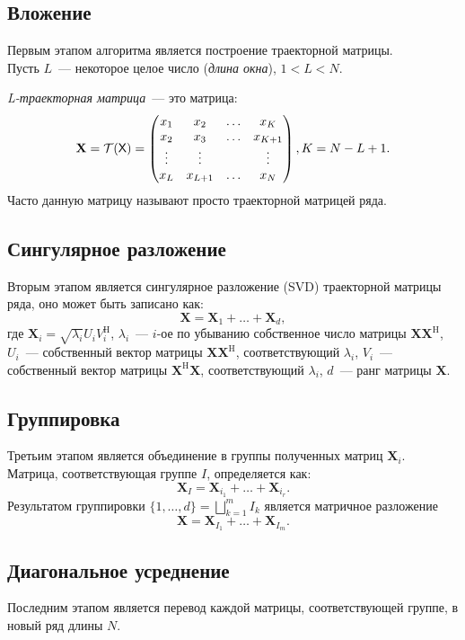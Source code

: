 \documentclass[specialist,
               substylefile = spbu.rtx,
               subf,href,colorlinks=true, 12pt]{disser}
\begin{document}
\subsection{Вложение}
Первым этапом алгоритма является построение траекторной матрицы.\\
Пусть $L$~--- некоторое целое число (\textit{длина окна}), $1 < L < N$.

\textit{L-траекторная матрица}~--- это матрица:
$$\mathbf{X} = \mathcal{T}(\textsf{X}) = \begin{pmatrix}
           x_1 & x_2 & \ldots & x_{K}\\
           x_2 & x_3 & \ldots & x_{K+1}\\
           \vdots & \vdots & & \vdots\\
           x_{L} & x_{L+1} & \ldots & x_{N}
         \end{pmatrix}, K = N - L + 1.$$
Часто данную матрицу называют просто траекторной матрицей ряда.
\subsection{Сингулярное разложение}
Вторым этапом является сингулярное разложение (SVD) траекторной матрицы ряда, оно может быть записано как:
$$\mathbf{X} = \mathbf{X}_1 + \ldots + \mathbf{X}_d,$$
где $\mathbf{X}_i = \sqrt{\lambda_i}U_i V_i^\mathrm{H}$, $\lambda_i$~--- $i$-ое по убыванию собственное число матрицы $\mathbf{X} \mathbf{X}^{\mathrm{H}}$, $U_i$~--- собственный вектор матрицы $\mathbf{X} \mathbf{X}^{\mathrm{H}}$, соответствующий $\lambda_i$, $V_i$~--- собственный вектор матрицы $\mathbf{X}^{\mathrm{H}} \mathbf{X}$, соответствующий $\lambda_i$, $d$~--- ранг матрицы $\mathbf{X}$.
\subsection{Группировка}
Третьим этапом является объединение в группы полученных матриц $\mathbf{X}_i$.
Матрица, соответствующая группе $I$, определяется как:
$$\mathbf{X}_I = \mathbf{X}_{i_1} + \ldots + \mathbf{X}_{i_r}.$$
Результатом группировки $\{1,\ldots,d\} = \bigsqcup_{k=1}^m I_k$ является матричное разложение
$$\mathbf{X} = \mathbf{X}_{I_1} + \ldots + \mathbf{X}_{I_m}.$$
\subsection{Диагональное усреднение}
Последним этапом является перевод каждой матрицы, соответствующей группе, в новый ряд длины $N$.
\end{document}
